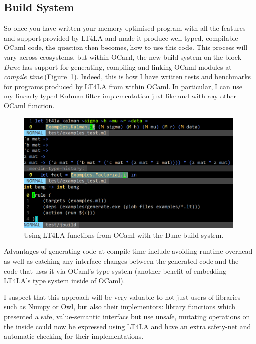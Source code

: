 \subsection{Build System}

So once you have written your memory-optimised program with all the features
and support provided by LT4LA and made it produce well-typed, compilable OCaml
code, the question then becomes, how to use this code. This process will vary
across ecosystems, but within OCaml, the new build-system on the block
\emph{Dune} has support for generating, compiling and linking OCaml modules at
\emph{compile time} (Figure~\ref{fig:build}). Indeed, this is how I have written
tests and benchmarks for programs produced by LT4LA from within OCaml. In
particular, I can use my linearly-typed Kalman filter implementation just like
and with any other OCaml function.

\begin{figure}[t]
    \centering
    \includegraphics[width=\textwidth]{impl_build}
    \caption{Using LT4LA functions from OCaml with the Dune
        build-system.}\label{fig:build}
\end{figure}

Advantages of generating code at compile time include avoiding runtime overhead
as well as catching any interface changes between the generated code and the
code that uses it via OCaml's type system (another benefit of embedding LT4LA's
type system inside of OCaml).

I suspect that this approach will be very valuable to not just users of
libraries such as Numpy or Owl, but also their implementors: library functions
which presented a safe, value-semantic interface but use unsafe, mutating
operations on the inside could now be expressed using LT4LA and have an extra
safety-net and automatic checking for their implementations.

